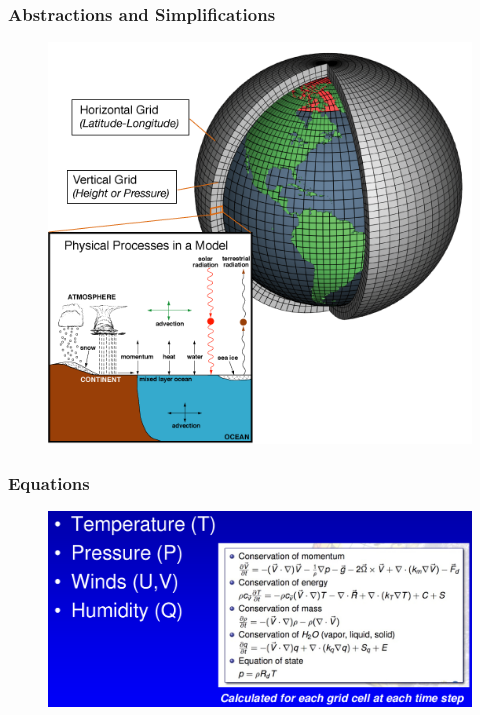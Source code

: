 \documentclass[11pt]{beamer}
\begin{document}
\begin{frame}[c]\frametitle{Abstractions and Simplifications}
    \begin{figure}
        \includegraphics[height=0.8\textheight]{figures/climate_abstractions.png}
    \end{figure}
\end{frame}


\begin{frame}[c]\frametitle{Equations}
    \begin{figure}
        \includegraphics[width=\textwidth]{figures/climate_equations.png}
    \end{figure}
\end{frame}
\end{document}
